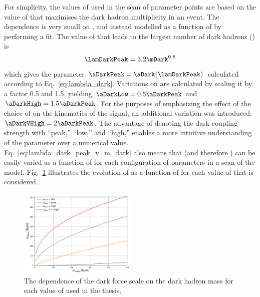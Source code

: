 For simplicity, the values of \aDark used in the scan of parameter points are based on the value of \lamDark that maximises the dark hadron multiplicity in an event. The dependence is very small on \mZprime, and instead modelled as a function of \mDark by performing a fit. The value of \lamDark that leads to the largest number of dark hadrons (\lamDarkPeak) is
\begin{equation}
    \lamDarkPeak = 3.2 \mDark^{0.8}
    \label{eq:lambda_dark_peak_v_m_dark}
\end{equation}
which gives the parameter $\aDarkPeak = \aDark(\lamDarkPeak)$ calculated according to Eq.~\ref{eq:lambda_dark}. Variations on \aDark are calculated by scaling it by a factor 0.5 and 1.5, yielding $\aDarkLow = \text{0.5}\aDarkPeak$ and $\aDarkHigh = \text{1.5}\aDarkPeak$. For the purposes of emphasizing the effect of the choice of \aDark on the kinematics of the signal, an additional variation was introduced: $\aDarkVHigh = \text{2}\aDarkPeak$. The advantage of denoting the dark coupling strength with ``peak,'' ``low,'' and ``high,'' enables a more intuitive understanding of the parameter over a numerical value. Eq.~\ref{eq:lambda_dark_peak_v_m_dark} also means that \lamDark (and therefore \aDark) can be easily varied as a function of \mDark for each configuration of parameters in a scan of the model. Fig.~\ref{fig:svj_lamDark_vs_mDark} illustrates the evolution of \lamDark as a function of \mDark for each value of \aDark that is considered.

\begin{figure}[htbp]
    \centering
    \includegraphics[width=0.5\textwidth]{figures/lambda_dark_vs_mDark_with_vHigh.pdf}
    \caption[The dependence of the dark force scale \lamDark on the dark hadron mass \mDark for each value of \aDark used in the thesis]{The dependence of the dark force scale \lamDark on the dark hadron mass \mDark for each value of \aDark used in the thesis.}
    \label{fig:svj_lamDark_vs_mDark}
\end{figure}


